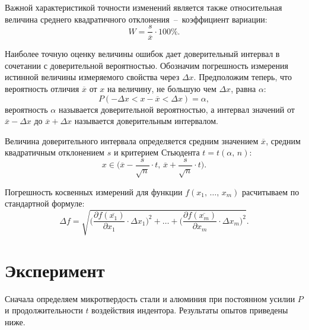 \documentclass[12pt, a4paper]{article}
\begin{document}
    Важной характеристикой точности изменений является также относительная величина среднего квадратичного отклонения~--~коэффициент вариации:
    \begin{equation}
        W = \frac{s}{\overline{x}} \cdot 100\%.
        \label{eq7}
    \end{equation}
    
    Наиболее точную оценку величины ошибок дает доверительный интервал в сочетании с доверительной вероятностью. Обозначим погрешность измерения истинной величины измеряемого свойства через $\Delta x$. Предположим теперь, что вероятность отличия $\overline{x}$ от $x$ на величину, не большую чем $\Delta x$, равна $\alpha$:
    \begin{equation}
        P(-\Delta x < x - \overline{x} < \Delta x) = \alpha,
        \label{eq8}
    \end{equation}
    вероятность $\alpha$ называется доверительной вероятностью, а интервал значений от $\overline{x} - \Delta x$ до $\overline{x} + \Delta x$ называется доверительным интервалом.
    
    Величина доверительного интервала определяется средним значением $\overline{x}$, средним квадратичным отклонением $s$ и критерием Стьюдента $t = t(\alpha, \, n)$:
    \begin{equation}
        x \in \bigg (\overline{x} - \frac{s}{\sqrt{n}} \cdot t, \, \overline{x} + \frac{s}{\sqrt{n}} \cdot t \bigg ).
        \label{eq9}
    \end{equation}
    
    Погрешность косвенных измерений для функции $f(x_{1}, \, \ldots, \, x_{m})$ расчитываем по стандартной формуле:
    \begin{equation}
        \Delta f = \sqrt{\Bigg( \frac{\partial f(\overline{x_{1}})}{\partial x_{1}} \cdot \Delta x_{1}\Bigg )^{2} + \ldots + \Bigg( \frac{\partial f(\overline{x_{m}})}{\partial x_{m}} \cdot \Delta x_{m}\Bigg )^{2}}.
        \label{eq10}
    \end{equation}
    
    \newpage
    
    \section{Эксперимент}
    
    Сначала определяем микротвердость стали и алюминия при постоянном усилии $P$ и продолжительности $t$ воздействия индентора. Результаты опытов приведены ниже.
    
\end{document}
